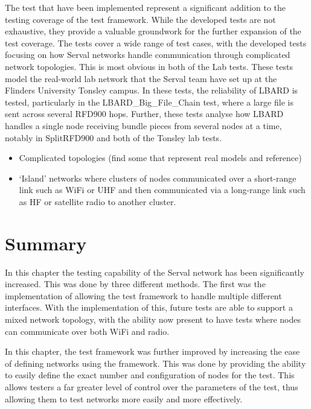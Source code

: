 The test that have been implemented represent a significant addition to the testing coverage of the test framework.
While the developed tests are not exhaustive, they provide a valuable groundwork for the further expansion of the test coverage.
The tests cover a wide range of test cases, with the developed tests focusing on how Serval networks handle communication through complicated network topologies.
This is most obvious in both of the Lab tests. These tests model the real-world lab network that the Serval team have set up at the Flinders University Tonsley campus.
In these tests, the reliability of LBARD is tested, particularly in the LBARD\_Big\_File\_Chain test, where a large file is sent across several RFD900 hops.
Further, these tests analyse how LBARD handles a single node receiving bundle pieces from several nodes at a time, notably in SplitRFD900 and both of the Tonsley lab tests.


\begin{itemize}
    \item Complicated topologies (find some that represent real models and reference) 
    \item ‘Island’ networks where clusters of nodes communicated over a short-range link such as WiFi or UHF and then communicated via a long-range link such as HF or satellite radio to another cluster. 
\end{itemize}




\pagebreak
\section{Summary}
In this chapter the testing capability of the Serval network has been significantly increased.
This was done by three different methods.
The first was the implementation of allowing the test framework to handle multiple different interfaces.
With the implementation of this, future tests are able to support a mixed network topology, with the ability now present to have tests where nodes can communicate over both WiFi and radio. 

In this chapter, the test framework was further improved by increasing the ease of defining networks using the framework.
This was done by providing the ability to easily define the exact number and configuration of nodes for the test.
This allows testers a far greater level of control over the parameters of the test, thus allowing them to test networks more easily and more effectively.

